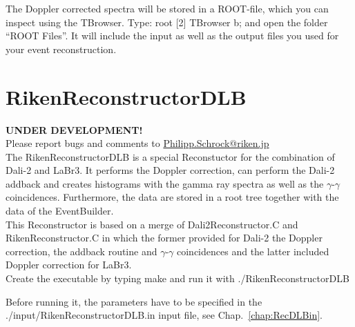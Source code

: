 \documentclass[12pt]{book}
\begin{document}
The Doppler corrected spectra will be stored in a ROOT-file, which you can inspect using the TBrowser. 
Type:\hfill{}
\linebreak
\linebreak
{\ttfamily root [2] TBrowser b;
}
\linebreak
\linebreak
and open the folder ``ROOT Files''. It will include the input as well as the output files you used for your 
event reconstruction.


\section{RikenReconstructorDLB} \label{chap_recDLB}

\textbf{UNDER DEVELOPMENT!}\\ %
Please report bugs and comments to \href{mailto:Philipp.Schrock@riken.jp}{Philipp.Schrock@riken.jp}\\

The RikenReconstructorDLB is a special Reconstuctor for the combination of Dali-2 and LaBr3. It performs the Doppler correction, can perform the Dali-2 addback and creates histograms with the gamma ray spectra as well as the $\gamma$-$\gamma$ coincidences. Furthermore, the data are stored in a root tree together with the data of the EventBuilder.\\
This Reconstructor is based on a merge of Dali2Reconstructor.C and RikenReconstructor.C in which the former provided for Dali-2 the Doppler correction, the addback routine and $\gamma$-$\gamma$ coincidences and the latter included Doppler correction for LaBr3. \\
Create the executable by typing\hfill{}
\linebreak
\linebreak
{\ttfamily make}
\linebreak
\linebreak
and run it with\hfill{}
\linebreak
\linebreak
{\ttfamily ./RikenReconstructorDLB}
\linebreak
\linebreak

Before running it, the parameters have to be specified in the {\ttfamily ./input/RikenReconstructorDLB.in} input file, see Chap.~\ref{chap:RecDLBin}.
\end{document}
